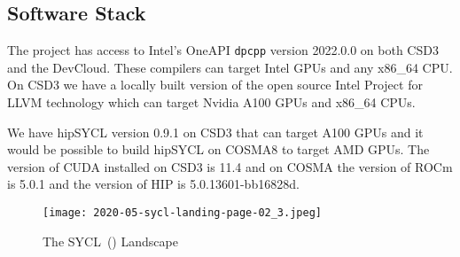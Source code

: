 \documentclass[main]{subfiles}
\begin{document}
\subsection{Software Stack}\label{sec:software_stack}

The project has access to Intel's OneAPI \texttt{dpcpp} version 2022.0.0 on both CSD3 and the DevCloud.
These compilers can target Intel GPUs and any x86\_64 CPU.
On CSD3 we have a locally built version of the open source Intel Project for LLVM technology which can target Nvidia A100 GPUs and x86\_64 CPUs.

We have hipSYCL version 0.9.1 on CSD3 that can target A100 GPUs and it would be possible to build hipSYCL on COSMA8 to target AMD GPUs. The version of CUDA installed on CSD3 is 11.4 and on COSMA the version of ROCm is 5.0.1 and the version of HIP is 5.0.13601-bb16828d.

\begin{figure}[htbp]
	\caption{The SYCL~(\cite{kronos_group_sycl_nodate}) Landscape}
	\texttt{[image: 2020-05-sycl-landing-page-02\_3.jpeg]} %
	\label{fig:sycl-landscape} %
\end{figure}
\end{document}
